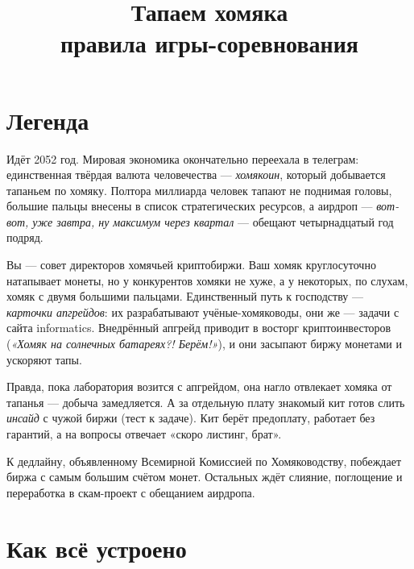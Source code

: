 \documentclass[12pt,a4paper]{article}
\title{\textbf{\textcolor{inkbrown}{Тапаем хомяка}}\\[4pt]
\large правила игры-соревнования}
\date{}
\begin{document}
\maketitle
\vspace{-2.5em}

\section*{Легенда}

Идёт 2052 год. Мировая экономика окончательно переехала в телеграм:
единственная твёрдая валюта человечества --- \emph{хомякоин}, который
добывается тапаньем по хомяку. Полтора миллиарда человек тапают
не поднимая головы, большие пальцы внесены в список стратегических
ресурсов, а аирдроп --- \emph{вот-вот, уже завтра, ну максимум через
квартал} --- обещают четырнадцатый год подряд.

Вы --- совет директоров хомячьей криптобиржи. Ваш хомяк круглосуточно
натапывает монеты, но у конкурентов хомяки не хуже, а у некоторых,
по слухам, хомяк с двумя большими пальцами. Единственный путь
к господству --- \emph{карточки апгрейдов}: их разрабатывают
учёные-хомяководы, они же --- задачи с сайта informatics. Внедрённый
апгрейд приводит в восторг криптоинвесторов (\emph{«Хомяк на солнечных
батареях?! Берём!»}), и они засыпают биржу монетами и ускоряют тапы.

Правда, пока лаборатория возится с апгрейдом, она нагло отвлекает
хомяка от тапанья --- добыча замедляется. А за отдельную плату знакомый
кит готов слить \emph{инсайд} с чужой биржи (тест к задаче). Кит берёт
предоплату, работает без гарантий, а на вопросы отвечает
«скоро листинг, брат».

К дедлайну, объявленному Всемирной Комиссией по Хомяководству, побеждает
биржа с самым большим счётом монет. Остальных ждёт слияние, поглощение
и переработка в скам-проект с обещанием аирдропа.

\section*{Как всё устроено}
\end{document}
